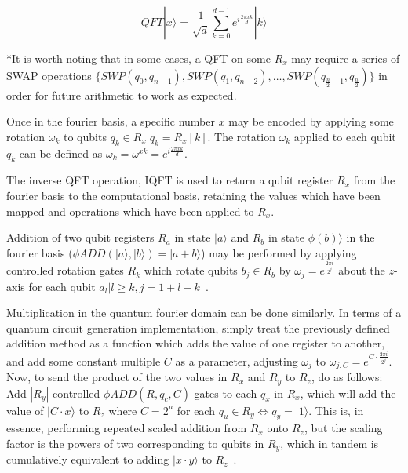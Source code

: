\documentclass[twocolumn]{cinc}
\begin{document}
  \begin{equation}\label{eqn:QFT}
    QFT|x\rangle = \frac{1}{\sqrt{d}} \sum_{k=0}^{d-1}e^{i{\frac{2\pi x k}{d}}}|k\rangle
  \end{equation}

  *It is worth noting that in some cases, a QFT on some $R_x$ may require a series of SWAP
  operations $\{ SWP(q_0,q_{n-1}), SWP(q_1,q_{n-2}), \ldots, SWP(q_{\frac{n}{2}-1},q_{\frac{n}{2}})\}$
  in order for future arithmetic to work as expected.

  Once in the fourier basis, a specific number $x$ may be encoded by applying some
  rotation $\omega_k$ to qubits $q_k \in R_x | q_k=R_x[k]$. The rotation $\omega_k$ applied
  to each qubit $q_k$ can be defined as $\omega_k = \omega^{x k} = e^{i \frac{2\pi x k}{d}}$.

  The inverse QFT operation, IQFT is used to return a qubit register $R_x$ from the fourier basis to the 
  computational basis, retaining the values which have been mapped and operations
  which have been applied to $R_x$.

  Addition of two qubit registers $R_a$ in state $|a\rangle$ and $R_b$ in state 
  $\phi(b)\rangle$ in the fourier basis 
  ($\phi ADD(|a\rangle, |b\rangle)=|a + b\rangle$) may be performed by applying
  controlled rotation gates $R_k$ which rotate qubits $b_j \in R_b$ by 
  $\omega_j=e^\frac{2\pi i}{2^j}$ about the $z$-axis for each 
  qubit $a_l | l \ge k, j=1+l-k$~\cite{quantum_arithmetic}. 

  Multiplication in the quantum fourier domain can be done similarly. In terms of
  a quantum circuit generation implementation, simply treat the previously defined
  addition method as a function which adds the value of one register to another,
  and add some constant multiple $C$ as a parameter, adjusting $\omega_j$ to 
  $\omega_{j,C}=e^{C\cdot \frac{2\pi i}{2^j}}$. Now, to send the product of the two values in $R_x$
  and $R_y$ to $R_z$, do as follows: Add $|R_y|$ controlled $\phi ADD(R, q_c, C)$ gates to each
  $q_x$ in $R_x$, which will add the value of $|C\cdot x\rangle$ to $R_z$ where $C=2^u$ for
  each $q_u \in R_y \iff q_y = |1\rangle$. This is, in essence, performing repeated scaled addition from $R_x$ onto
  $R_z$, but the scaling factor is the powers of two corresponding to qubits in $R_y$, which
  in tandem is cumulatively equivalent to adding $|x\cdot y\rangle$ to $R_z$~\cite{quantum_arithmetic}.
\end{document}
